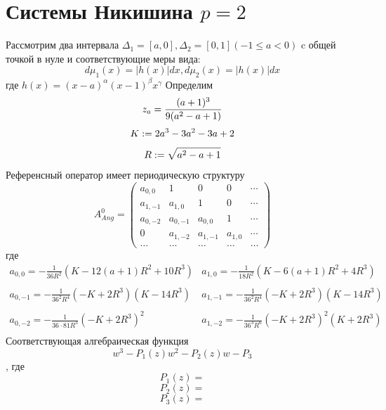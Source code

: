 \documentclass[12pt, a4paper]{report}
\begin{document}
\section{Системы Никишина $p=2$}
Рассмотрим два интервала $\Delta_1=[a,0], \Delta_2=[0,1] (-1 \leq a <0)$ c общей точкой в нуле и соответствующие меры вида:
$$
d\mu_1(x)=|h(x)|dx, d\mu_2(x)=|h(x)|dx
$$ 
где $h(x)=(x-a)^\alpha(x-1)^\beta x^\gamma$
Определим
$$
z_a=\frac{(a+1)^3}{9(a^2-a+1)} \\
$$
$$
K :=2a^3-3a^2-3a+2 \\ 
$$
$$
R :=\sqrt{a^2-a+1} \\
$$
Референсный оператор имеет периодическую структуру
$$
A^0_{Ang}=
\left(\begin{array}{cccccccccccc}
a_{0,0}  & 1 		& 0 	  & 0 		 &  \cdots \\
a_{1,-1} & a_{1,0}  & 1 	  & 0 		 &  \cdots \\
a_{0,-2} & a_{0,-1} & a_{0,0} & 1 		 &  \cdots \\
0 		 & a_{1,-2} & a_{1,-1} & a_{1,0} &  \cdots \\
\ldots & \ldots & \ldots & \ldots & \ldots
\end{array}\right)
$$
где 
$$
\begin{array}{llllllllllllllll}
a_{0,0} = -\displaystyle\frac {1}{36R^2} \left( K -12(a+1)R^2+10R^3\right) & a_{1,0}=-\displaystyle\frac{1}{18R^2} (K-6(a+1)R^2+4R^3) \\ \\ 
a_{0,-1}=-\displaystyle\frac{1}{36^2R^4}(-K+2R^3)(K-14R^3) & a_{1,-1}=-\displaystyle\frac{1}{36^2R^4}(-K+2R^3)(K-14R^3)\\ \\
a_{0,-2}=-\displaystyle\frac{1}{36\cdot 81 R^3}(-K+2R^3)^2 & a_{1,-2}=-\displaystyle\frac{1}{36^3 R^6}(-K+2R^3)^2(K+2R^3) \\
\end{array}
$$
Соответствующая алгебраическая функция
$$
w^3-P_1(z)w^2-P_2(z)w-P_3
$$
, где
$$
P_1(z)=
$$
$$
P_2(z)=
$$
$$
P_3(z)=
$$
\end{document}
